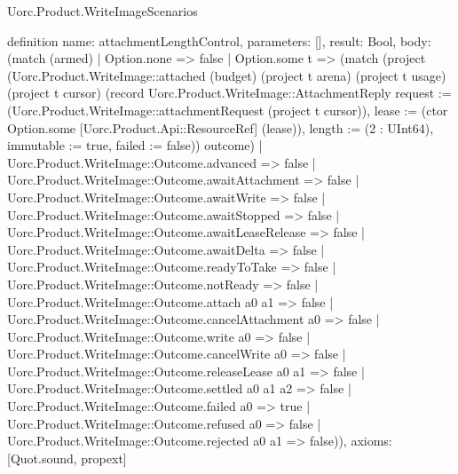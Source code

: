 \begin{lexlean}{Uorc.Product.WriteImageScenarios}
\begin{semanticmodule}
definition{
  name: attachmentLengthControl,
  parameters: [],
  result: Bool,
  body: (match (armed)
    | Option.none => false
    | Option.some t => (match (project (Uorc.Product.WriteImage::attached (budget) (project t arena) (project t usage) (project t cursor) (record Uorc.Product.WriteImage::AttachmentReply {request := (Uorc.Product.WriteImage::attachmentRequest (project t cursor)), lease := (ctor Option.some [Uorc.Product.Api::ResourceRef] (lease)), length := (2 : UInt64), immutable := true, failed := false})) outcome)
      | Uorc.Product.WriteImage::Outcome.advanced => false
      | Uorc.Product.WriteImage::Outcome.awaitAttachment => false
      | Uorc.Product.WriteImage::Outcome.awaitWrite => false
      | Uorc.Product.WriteImage::Outcome.awaitStopped => false
      | Uorc.Product.WriteImage::Outcome.awaitLeaseRelease => false
      | Uorc.Product.WriteImage::Outcome.awaitDelta => false
      | Uorc.Product.WriteImage::Outcome.readyToTake => false
      | Uorc.Product.WriteImage::Outcome.notReady => false
      | Uorc.Product.WriteImage::Outcome.attach a0 a1 => false
      | Uorc.Product.WriteImage::Outcome.cancelAttachment a0 => false
      | Uorc.Product.WriteImage::Outcome.write a0 => false
      | Uorc.Product.WriteImage::Outcome.cancelWrite a0 => false
      | Uorc.Product.WriteImage::Outcome.releaseLease a0 a1 => false
      | Uorc.Product.WriteImage::Outcome.settled a0 a1 a2 => false
      | Uorc.Product.WriteImage::Outcome.failed a0 => true
      | Uorc.Product.WriteImage::Outcome.refused a0 => false
      | Uorc.Product.WriteImage::Outcome.rejected a0 a1 => false)),
  axioms: [Quot.sound, propext]
}


\end{semanticmodule}
\end{lexlean}
